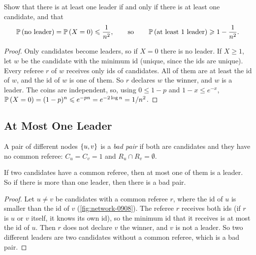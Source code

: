 \begin{exercisebox}
\begin{exercise}\label{ex:atleast-0908}\label{thm:leader-atleast-0908}
    Show that there is at least one leader if and only if there is at least one candidate, and that
    \[\prob{\text{no leader}} = \prob{X = 0} \leq \frac{1}{n^2},
        \qquad\text{so}\qquad
        \prob{\text{at least $1$ leader}} \geq 1 - \frac{1}{n^2}.\]
\end{exercise}
\tcblower
\begin{proof}
    Only candidates become leaders, so if $X = 0$ there is no leader. If $X \geq 1$, let
    $w$ be the candidate with the minimum id (unique, since the ids are unique). Every referee $r$
    of $w$ receives only ids of candidates. All of them are at least the id of $w$, and the id of
    $w$ is one of them. So $r$ declares $w$ the winner, and $w$ is a leader. The coins are
    independent, so, using $0 \leq 1 - p$ and $1 - x \leq e^{-x}$,
    $\prob{X = 0} = (1 - p)^{n} \leq e^{-pn} = e^{-2 \log n} = \sfrac{1}{n^2}$.
\end{proof}
\end{exercisebox}

\subsection{At Most One Leader}

A pair of different nodes $\left\lbrace u,v\right\rbrace$ is a \emph{bad pair} if both are candidates and they have no
common referee: $C_u = C_v = 1$ and $R_u \cap R_v = \emptyset$.

\begin{claim}\label{lem:badpair-0908}
    If two candidates have a common referee, then at most one of them is a leader. So if
    there is more than one leader, then there is a bad pair.
\end{claim}

\begin{proof}
    Let $u \neq v$ be candidates with a common referee $r$, where the id of $u$ is smaller than the
    id of $v$ (\cref{fig:network-0908}). The referee $r$ receives both ids (if $r$ is $u$ or $v$
    itself, it knows its own id), so the minimum id that it receives is at most the id of $u$. Then
    $r$ does not declare $v$ the winner, and $v$ is not a leader. So two different leaders are two
    candidates without a common referee, which is a bad pair.
\end{proof}

